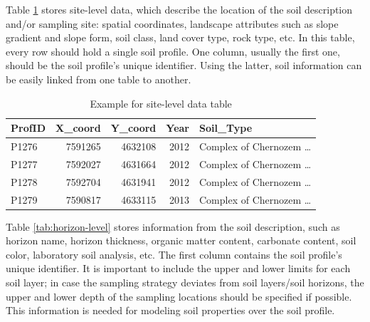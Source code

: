 \documentclass[10pt,b5paper,]{book}
\theoremstyle{definition}
\theoremstyle{definition}
\theoremstyle{definition}
\theoremstyle{remark}
\begin{document}
Table \ref{tab:site-level} stores site-level data, which describe the
location of the soil description and/or sampling site: spatial
coordinates, landscape attributes such as slope gradient and slope form,
soil class, land cover type, rock type, etc. In this table, every row
should hold a single soil profile. One column, usually the first one,
should be the soil profile's unique identifier. Using the latter, soil
information can be easily linked from one table to another.

\begin{table}

\caption{\label{tab:site-level}Example for site-level data table}
\centering
\begin{tabular}[t]{lrrrl}
\toprule
ProfID & X\_coord & Y\_coord & Year & Soil\_Type\\
\midrule
P1276 & 7591265 & 4632108 & 2012 & Complex of Chernozem …\\
P1277 & 7592027 & 4631664 & 2012 & Complex of Chernozem …\\
P1278 & 7592704 & 4631941 & 2012 & Complex of Chernozem …\\
P1279 & 7590817 & 4633115 & 2013 & Complex of Chernozem …\\
\bottomrule
\end{tabular}
\end{table}

Table \ref{tab:horizon-level} stores information from the soil
description, such as horizon name, horizon thickness, organic matter
content, carbonate content, soil color, laboratory soil analysis, etc.
The first column contains the soil profile's unique identifier. It is
important to include the upper and lower limits for each soil layer; in
case the sampling strategy deviates from soil layers/soil horizons, the
upper and lower depth of the sampling locations should be specified if
possible. This information is needed for modeling soil properties over
the soil profile.
\end{document}
